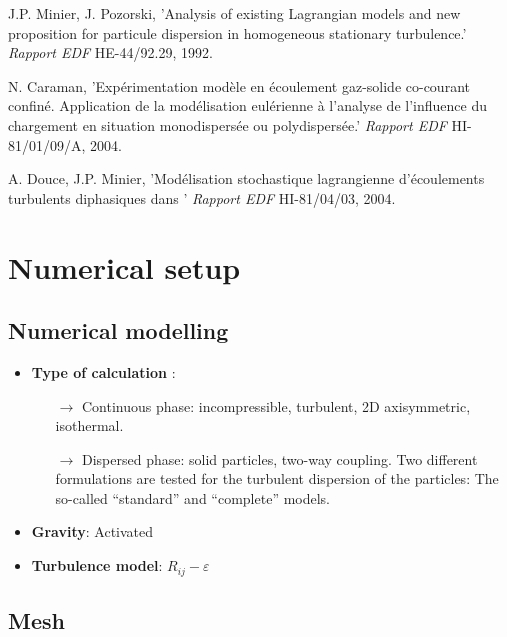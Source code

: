 \documentclass[a4paper,twoside,12pt]{article}
\begin{document}
\begin{thebibliography}{3}
    J.P. Minier, J. Pozorski,
   'Analysis of existing Lagrangian models and new
   proposition for particule dispersion in
   homogeneous stationary turbulence.'
   {\it Rapport EDF} HE-44/92.29, 1992.

    N. Caraman,
   'Exp\'erimentation mod\`ele en \'ecoulement gaz-solide co-courant confin\'e.
   Application de la mod\'elisation eul\'erienne \`a l'analyse de l'influence
   du chargement en situation monodispers\'ee ou polydispers\'ee.'
   {\it Rapport EDF} HI-81/01/09/A, 2004.

    A. Douce, J.P. Minier,
   'Mod\'elisation stochastique lagrangienne d'\'ecoulements turbulents
   diphasiques dans \CS'
   {\it Rapport EDF} HI-81/04/03, 2004.

\end{thebibliography}

\section{Numerical setup}

\subsection{Numerical modelling}

\begin{itemize}

   \item \textbf{Type of calculation} :
         \begin{itemize}
            \item[$\rightarrow$] Continuous phase: incompressible, turbulent, 2D axisymmetric, isothermal.
            \item[$\rightarrow$] Dispersed phase: solid particles, two-way coupling. Two different formulations are tested for the turbulent dispersion of the particles: The so-called ``standard'' and ``complete'' models.
         \end{itemize}

   \item \textbf{Gravity}: Activated

   \item \textbf{Turbulence model}: $R_{ij}-\varepsilon$

\end{itemize}

\subsection{Mesh}
\end{document}
